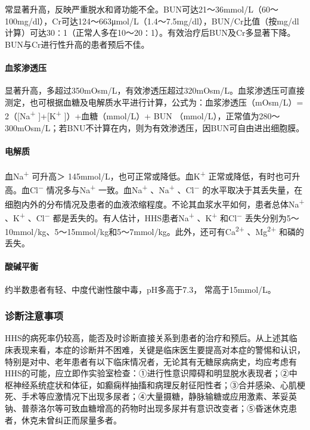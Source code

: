 常显著升高，反映严重脱水和肾功能不全。BUN可达21～36mmol/L（60～100mg/dl），Cr可达124～663μmol/L（1.4～7.5mg/dl），BUN/Cr比值（按mg/dl计算）可达30∶1（正常人多在10～20∶1）。有效治疗后BUN及Cr多显著下降。BUN与Cr进行性升高的患者预后不佳。

\paragraph{血浆渗透压}

显著升高，多超过350mOsm/L，有效渗透压超过320mOsm/L。血浆渗透压可直接测定，也可根据血糖及电解质水平进行计算，公式为：血浆渗透压（mOsm/L）=
2（{[}Na\textsuperscript{+} {]}+{[}K\textsuperscript{+}
{]}）+血糖（mmol/L）+ BUN
（mmol/L），正常值为280～300mOsm/L；若BNU不计算在内，则为有效渗透压，因BUN可自由进出细胞膜。

\paragraph{电解质}

血Na\textsuperscript{+} 可升高＞
145mmol/L，也可正常或降低。血K\textsuperscript{+}
正常或降低，有时也可升高。血Cl\textsuperscript{−}
情况多与Na\textsuperscript{+} 一致。血Na\textsuperscript{+}
、Na\textsuperscript{+} 、Cl\textsuperscript{−}
的水平取决于其丢失量，在细胞内外的分布情况及患者的血液浓缩程度。不论其血浆水平如何，患者总体Na\textsuperscript{+}
、K\textsuperscript{+} 、Cl\textsuperscript{−}
都是丢失的。有人估计，HHS患者Na\textsuperscript{+}
、K\textsuperscript{+} 和Cl\textsuperscript{−}
丢失分别为5～10mmol/kg、5～15mmol/kg和5～7mmol/kg。此外，还可有Ca\textsuperscript{2+}
、Mg\textsuperscript{2+} 和磷的丢失。

\paragraph{酸碱平衡}

约半数患者有轻、中度代谢性酸中毒，pH多高于7.3，{} 常高于15mmol/L。

\subsubsection{诊断注意事项}

HHS的病死率仍较高，能否及时诊断直接关系到患者的治疗和预后。从上述其临床表现来看，本症的诊断并不困难，关键是临床医生要提高对本症的警惕和认识，特别是对中、老年患者有以下临床情况者，无论其有无糖尿病病史，均应考虑有HHS的可能，应立即作实验室检查：①进行性意识障碍和明显脱水表现者；②中枢神经系统症状和体征，如癫痫样抽搐和病理反射征阳性者；③合并感染、心肌梗死、手术等应激情况下出现多尿者；④大量摄糖，静脉输糖或应用激素、苯妥英钠、普萘洛尔等可致血糖增高的药物时出现多尿并有意识改变者；⑤昏迷休克患者，休克未曾纠正而尿量多者。

